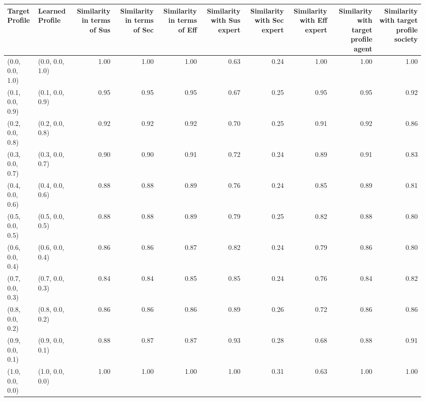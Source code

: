 \begin{tabular}{llrrrrrrrr}
\toprule
Target Profile & Learned Profile & Similarity in terms of Sus & Similarity in terms of Sec & Similarity in terms of Eff & Similarity with Sus expert & Similarity with Sec expert & Similarity with Eff expert & Similarity with target profile agent & Similarity with target profile society \\
\midrule
(0.0, 0.0, 1.0) & (0.0, 0.0, 1.0) & 1.00 & 1.00 & 1.00 & 0.63 & 0.24 & 1.00 & 1.00 & 1.00 \\
(0.1, 0.0, 0.9) & (0.1, 0.0, 0.9) & 0.95 & 0.95 & 0.95 & 0.67 & 0.25 & 0.95 & 0.95 & 0.92 \\
(0.2, 0.0, 0.8) & (0.2, 0.0, 0.8) & 0.92 & 0.92 & 0.92 & 0.70 & 0.25 & 0.91 & 0.92 & 0.86 \\
(0.3, 0.0, 0.7) & (0.3, 0.0, 0.7) & 0.90 & 0.90 & 0.91 & 0.72 & 0.24 & 0.89 & 0.91 & 0.83 \\
(0.4, 0.0, 0.6) & (0.4, 0.0, 0.6) & 0.88 & 0.88 & 0.89 & 0.76 & 0.24 & 0.85 & 0.89 & 0.81 \\
(0.5, 0.0, 0.5) & (0.5, 0.0, 0.5) & 0.88 & 0.88 & 0.89 & 0.79 & 0.25 & 0.82 & 0.88 & 0.80 \\
(0.6, 0.0, 0.4) & (0.6, 0.0, 0.4) & 0.86 & 0.86 & 0.87 & 0.82 & 0.24 & 0.79 & 0.86 & 0.80 \\
(0.7, 0.0, 0.3) & (0.7, 0.0, 0.3) & 0.84 & 0.84 & 0.85 & 0.85 & 0.24 & 0.76 & 0.84 & 0.82 \\
(0.8, 0.0, 0.2) & (0.8, 0.0, 0.2) & 0.86 & 0.86 & 0.86 & 0.89 & 0.26 & 0.72 & 0.86 & 0.86 \\
(0.9, 0.0, 0.1) & (0.9, 0.0, 0.1) & 0.88 & 0.87 & 0.87 & 0.93 & 0.28 & 0.68 & 0.88 & 0.91 \\
(1.0, 0.0, 0.0) & (1.0, 0.0, 0.0) & 1.00 & 1.00 & 1.00 & 1.00 & 0.31 & 0.63 & 1.00 & 1.00 \\
\bottomrule
\end{tabular}
